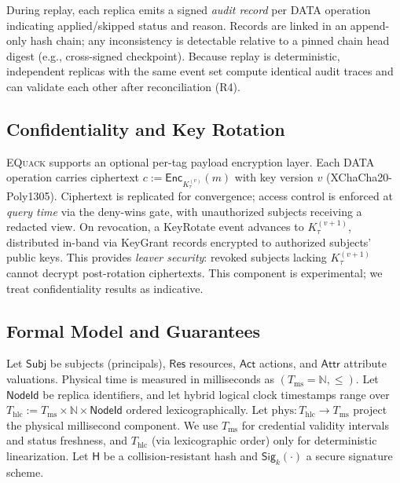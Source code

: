 \documentclass[10pt,journal,compsoc]{IEEEtran}
\newcommand{\equack}{\textsc{EQuack}}
\begin{document}
During replay, each replica emits a signed \emph{audit record} per DATA operation indicating applied/skipped status and reason. Records are linked in an append-only hash chain; any inconsistency is detectable relative to a pinned chain head digest (e.g., cross-signed checkpoint). Because replay is deterministic, independent replicas with the same event set compute identical audit traces and can validate each other after reconciliation (R4).

\subsection{Confidentiality and Key Rotation}

\equack{} supports an optional per-tag payload encryption layer. Each DATA operation carries ciphertext $c := \mathsf{Enc}_{K_{\tau}^{(v)}}(m)$ with key version $v$ (XChaCha20-Poly1305). Ciphertext is replicated for convergence; access control is enforced at \emph{query time} via the deny-wins gate, with unauthorized subjects receiving a redacted view. On revocation, a KeyRotate event advances to $K_{\tau}^{(v+1)}$, distributed in-band via KeyGrant records encrypted to authorized subjects' public keys. This provides \emph{leaver security}: revoked subjects lacking $K_{\tau}^{(v+1)}$ cannot decrypt post-rotation ciphertexts. This component is experimental; we treat confidentiality results as indicative.

\subsection{Formal Model and Guarantees}\label{subsec:ecac-model-paperC}

Let $\mathsf{Subj}$ be subjects (principals), $\mathsf{Res}$ resources, $\mathsf{Act}$ actions, and $\mathsf{Attr}$ attribute valuations.
Physical time is measured in milliseconds as $(T_{\mathrm{ms}}=\mathbb{N}, \le)$.
Let $\mathsf{NodeId}$ be replica identifiers, and let hybrid logical clock timestamps range over
$T_{\mathrm{hlc}} := T_{\mathrm{ms}} \times \mathbb{N} \times \mathsf{NodeId}$ ordered lexicographically.
Let $\mathrm{phys} : T_{\mathrm{hlc}} \to T_{\mathrm{ms}}$ project the physical millisecond component.
We use $T_{\mathrm{ms}}$ for credential validity intervals and status freshness, and $T_{\mathrm{hlc}}$ (via lexicographic order) only for deterministic linearization.
Let $\mathsf{H}$ be a collision-resistant hash and $\mathsf{Sig}_k(\cdot)$ a secure signature scheme.
\end{document}
